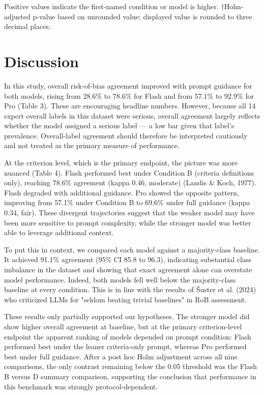 \documentclass[11pt,a4paper]{article}
\begin{document}
Positive values indicate the first-named condition or model is higher. †Holm-adjusted p-value based on unrounded value; displayed value is rounded to three decimal places.

\section{Discussion}

In this study, overall risk-of-bias agreement improved with prompt guidance for both models, rising from 28.6\% to 78.6\% for Flash and from 57.1\% to 92.9\% for Pro (Table 3). These are encouraging headline numbers. However, because all 14 expert overall labels in this dataset were serious, overall agreement largely reflects whether the model assigned a serious label — a low bar given that label's prevalence. Overall-label agreement should therefore be interpreted cautiously and not treated as the primary measure of performance.

At the criterion level, which is the primary endpoint, the picture was more nuanced (Table 4). Flash performed best under Condition B (criteria definitions only), reaching 78.6\% agreement (kappa 0.46, moderate) (Landis \& Koch, 1977). Flash degraded with additional guidance. Pro showed the opposite pattern, improving from 57.1\% under Condition B to 69.6\% under full guidance (kappa 0.34, fair). These divergent trajectories suggest that the weaker model may have been more sensitive to prompt complexity, while the stronger model was better able to leverage additional context.

To put this in context, we compared each model against a majority-class baseline. It achieved 91.1\% agreement (95\% CI 85.8 to 96.3), indicating substantial class imbalance in the dataset and showing that exact agreement alone can overstate model performance. Indeed, both models fell well below the majority-class baseline at every condition. This is in line with the results of Šuster et al. (2024) who criticized LLMs for "seldom beating trivial baselines" in RoB assessment.

These results only partially supported our hypotheses. The stronger model did show higher overall agreement at baseline, but at the primary criterion-level endpoint the apparent ranking of models depended on prompt condition: Flash performed best under the leaner criteria-only prompt, whereas Pro performed best under full guidance. After a post hoc Holm adjustment across all nine comparisons, the only contrast remaining below the 0.05 threshold was the Flash B versus D summary comparison, supporting the conclusion that performance in this benchmark was strongly protocol-dependent.
\end{document}
